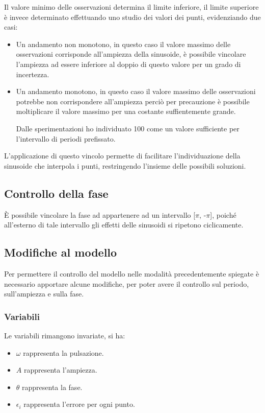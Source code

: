 \documentclass[a4paper,12pt]{report}
\begin{document}
Il valore minimo delle osservazioni determina il limite inferiore,
il limite superiore è invece determinato effettuando uno studio dei valori dei punti, evidenziando due casi:
\begin{itemize}
  \item Un andamento non monotono, in questo caso il valore massimo delle osservazioni corrisponde all'ampiezza della sinusoide, è possibile vincolare l'ampiezza ad essere inferiore al doppio di questo valore per un grado di incertezza.
  \item Un andamento monotono, in questo caso il valore massimo delle osservazioni potrebbe non corrispondere all'ampiezza perciò per precauzione è possibile moltiplicare il valore massimo per una costante suffientemente grande.

  Dalle sperimentazioni ho individuato 100  come un valore sufficiente per l'intervallo di periodi prefissato.
\end{itemize}

L'applicazione di questo vincolo permette di facilitare l'individuazione della sinusoide che interpola i punti, restringendo l'insieme delle possibili soluzioni.

\subsection{Controllo della fase}
È possibile vincolare la fase ad appartenere ad un intervallo [$\pi$, -$\pi$], poiché all'esterno di tale intervallo gli effetti delle sinusoidi si ripetono ciclicamente.

\subsection{Modifiche al modello}
Per permettere il controllo del modello nelle modalità precedentemente spiegate è necessario apportare alcune modifiche, per poter avere il controllo sul periodo, sull'ampiezza e sulla fase.


\subsubsection{Variabili}
Le variabili rimangono invariate, si ha:
\begin{itemize}
  \item $\omega$ rappresenta la pulsazione.
  \item $A$ rappresenta l'ampiezza.
  \item $\theta$ rappresenta la fase.
  \item $\epsilon_i$ rappresenta l'errore per ogni punto.
\end{itemize}
\end{document}
